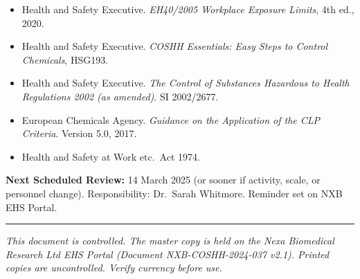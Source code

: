 \vspace{10pt}


\vspace{4pt}

{\small
\begin{itemize}[leftmargin=*, itemsep=3pt]
  \item Health and Safety Executive. \textit{EH40/2005 Workplace Exposure Limits},
        4th ed., 2020. \cite{eh40_2005}
  \item Health and Safety Executive. \textit{COSHH Essentials: Easy Steps to
        Control Chemicals}, HSG193. \cite{hsg193}
  \item Health and Safety Executive. \textit{The Control of Substances Hazardous
        to Health Regulations 2002 (as amended)}. SI 2002/2677. \cite{coshh_regs}
  \item European Chemicals Agency. \textit{Guidance on the Application of the
        CLP Criteria}. Version 5.0, 2017. \cite{echa_clp}
  \item Health and Safety at Work etc.\ Act 1974. \cite{hswa1974}
\end{itemize}
}

\vspace{8pt}

\begin{tcolorbox}[infobox]
  \faCalendar\quad \textbf{Next Scheduled Review:} 14 March 2025 (or sooner if
  activity, scale, or personnel change). Responsibility: Dr.\ Sarah Whitmore.
  Reminder set on NXB EHS Portal.
\end{tcolorbox}

\vspace{8pt}
{\color{NavyDeep!40}\hrule}
\vspace{4pt}
{\footnotesize\color{NavyDeep!60}\textit{%
  This document is controlled. The master copy is held on the Nexa Biomedical
  Research Ltd EHS Portal (Document NXB-COSHH-2024-037 v2.1). Printed copies
  are uncontrolled. Verify currency before use.
}}
